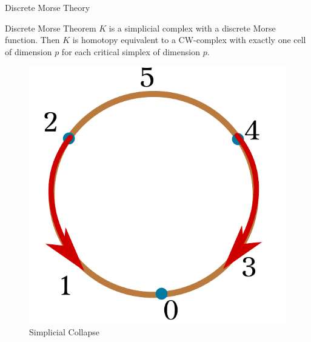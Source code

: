 \documentclass[9pt,sans-serif]{beamer}
\begin{document}
\begin{frame}{Discrete Morse Theory}
  \begin{block}{Discrete Morse Theorem}
    $K$ is a simplicial complex with a discrete Morse function. Then $K$ is
    homotopy equivalent to a CW-complex with exactly one cell of dimension $p$
    for each critical simplex of dimension $p$.
  \end{block}

  \pause
  
  \begin{figure}[htb]
    \centering \includegraphics[scale=0.5]{vectors}
    \caption{Simplicial Collapse}
  \end{figure}
\end{frame}
\end{document}
